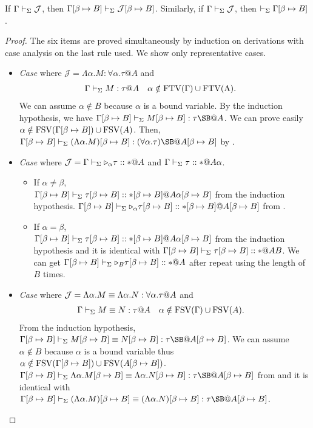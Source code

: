 \begin{lemma}
	If $\Gamma \vdash_\Sigma \mathcal{J}$, then $\Gamma[\beta\mapsto B] \vdash_\Sigma \mathcal{J}[\beta\mapsto B]$.  Similarly, if $\Gamma \vdash_\Sigma \mathcal{J}$, then $\vdash_\Sigma \Gamma[\beta\mapsto B]$.
\end{lemma}

\begin{proof}
	The six items are proved simultaneously by induction on derivations with case analysis on the last rule used.
	We show only representative cases.
	\begin{itemize}
						
		\newcommand{\SB}{[\beta \mapsto B]}
		\newcommand{\GG}{\G\SB}
		\newcommand{\GGV}{\G\SB \V}
		
		\item \textit{Case} \TGen{} where $\mathcal{J} = \Lambda\alpha.M:\forall\alpha.\tau@A$ and
		      \begin{align*}
		      	  & \G\V M:\tau@A &   & \alpha\notin\rm{FTV}(\G)\cup\rm{FTV}(A). 
		      \end{align*}
		      We can assume $\alpha \notin B$ because $\alpha$ is a bound variable.
		      By the induction hypothesis, we have \(\G\SB\V M\SB:\tau\SB@A\).
		      We can prove easily $\alpha \notin \FTV(\GG) \cup \FTV(A)$.
		      Then, \(\GGV (\Lambda\alpha.M)\SB:(\forall\alpha.\tau)\SB@A\SB\) by \TGen.
		      
	    \item \textit{Case} \KTW{} where \(\mathcal{J} = \Gamma\vdash_\Sigma {\mathop{\triangleright}}_\alpha \tau :: * @ A \) and \( \Gamma\vdash_\Sigma \tau :: * @ A\alpha \).
	      \begin{itemize}
	      	\item If $\alpha \neq \beta$,\\
					\( \GGV \tau\SB :: *\SB @ A\alpha\SB \) from the induction hypothesis.
					\( \GGV \TW_\alpha \tau\SB :: *\SB @ A\SB \) from \KTW.
	      	      	      	      	      	      	      	      	     	      
	      	\item If $\alpha = \beta$, \\
					\( \GGV \tau\SB :: *\SB @ A\alpha\SB \) from the induction hypothesis and
					it is identical with \( \GGV \tau\SB :: * @ AB \).
					We can get \( \GGV \TW_B \tau\SB :: * @ A \) after repeat using \KTW the length of $B$ times.

	      \end{itemize}
		
		\item \textit{Case} \QGen{} where \(\mathcal{J} = \Lambda\alpha.M \E \Lambda\alpha.N : \forall\alpha.\tau@A\) and 
		\begin{align*}
    		& \G\V M\E N : \tau@A && \alpha \notin \FTV(\G)\cup\FTV(A).
		\end{align*}
		From the induction hypothesis, \( \GGV M\SB \E N\SB : \tau\SB@A\SB \).
		We can assume \(\alpha \notin B \) because \(\alpha\) is a bound variable thus
		\( \alpha \notin \FTV(\G\SB)\cup\FTV(A\SB) \).
		\( \GGV \Lambda\alpha.M\SB \E \Lambda\alpha.N\SB : \tau\SB@A\SB \) from \QGen{} and
		it is identical with \( \GGV (\Lambda\alpha.M)\SB \E (\Lambda\alpha.N)\SB : \tau\SB@A\SB \).
		      

\end{itemize}
\end{proof}
